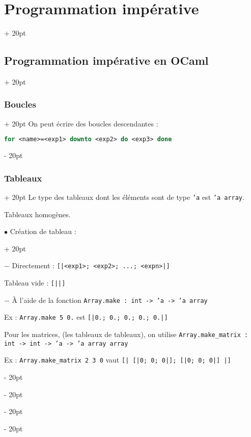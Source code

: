 \documentclass[a4paper, 12pt, twoside]{article}
\newcommand{\ind}[1][20pt]{\advance\leftskip + #1}
\newcommand{\deind}[1][20pt]{\advance\leftskip - #1}
\newenvironment{indentedenv}[1][20pt]{\par \ind[#1]}{\par \deind}
\newenvironment{indt}[2][20pt]{#2 \begin{indentedenv}[#1]}{\end{indentedenv}} %
\begin{document}
\begin{indt}{\section{Programmation impérative}}
\begin{indt}{\subsection{Programmation impérative en OCaml}}
\begin{indt}{\subsubsection{Boucles}}
                On peut écrire des boucles descendantes :
                
                \vspace{6pt}
                
                \begin{lstlisting}[language=Caml, xleftmargin=80pt]
for <name>=<exp1> downto <exp2> do <exp3> done\end{lstlisting}
            \end{indt}
            
            \vspace{6pt}
            
            \begin{indt}{\subsubsection{Tableaux}}
                Le type des tableaux dont les éléments sont de type \texttt{'a} est \texttt{'a array}.
                
                Tableaux homogènes.
                
                \vspace{6pt}
                
                \begin{indt}{$\bullet$ Création de tableau :}
                    
                    $-$ Directement : \texttt{[|<exp1>; <exp2>; ...; <expn>|]}
                    
                    Tableau vide : \texttt{[||]}
                    
                    \vspace{6pt}
                    
                    $-$ \`A l'aide de la fonction \texttt{Array.make : int -> 'a -> 'a array}
                    
                    Ex : \texttt{Array.make 5 0.} est \texttt{[|0.; 0.; 0.; 0.; 0.|]}
                    
                    \vspace{6pt}
                    
                    Pour les matrices, (les tableaux de tableaux), on utilise \texttt{Array.make\_matrix : int -> int -> 'a -> 'a array array}
                    
                    Ex : \texttt{Array.make\_matrix 2 3 0} vaut \texttt{[| [|0; 0; 0|]; [|0; 0; 0|] |]}
                    

\end{indt}
\end{indt}
\end{indt}
\end{indt}
\end{document}
